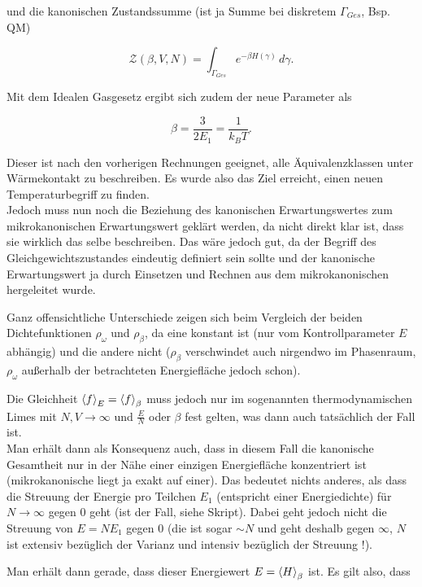 und die kanonischen Zustandssumme (ist ja Summe bei diskretem $\Gamma_{Ges}$, Bsp. QM)

\begin{equation}
\mathcal{Z}(\beta, V, N) = \int_{\Gamma_{Ges}} e^{-\beta H(\gamma)} \, d\gamma .
\end{equation}

Mit dem Idealen Gasgesetz ergibt sich zudem der neue Parameter als

\begin{equation}
\beta = \frac{3}{2 E_1} = \frac{1}{k_B T} .
\end{equation}

Dieser ist nach den vorherigen Rechnungen geeignet, alle Äquivalenzklassen unter Wärmekontakt zu beschreiben. Es wurde also das Ziel erreicht, einen neuen Temperaturbegriff zu finden.\\
Jedoch muss nun noch die Beziehung des kanonischen Erwartungswertes zum mikrokanonischen Erwartungswert geklärt werden, da nicht direkt klar ist, dass sie wirklich das selbe beschreiben. Das wäre jedoch gut, da der Begriff des Gleichgewichtszustandes eindeutig definiert sein sollte und der kanonische Erwartungswert ja durch Einsetzen und Rechnen aus dem mikrokanonischen hergeleitet wurde.

Ganz offensichtliche Unterschiede zeigen sich beim Vergleich der beiden Dichtefunktionen $\rho_\omega$ und $\rho_\beta$, da eine konstant ist (nur vom Kontrollparameter $E$ abhängig) und die andere nicht ($\rho_\beta$ verschwindet auch nirgendwo im Phasenraum, $\rho_\omega$ außerhalb der betrachteten Energiefläche jedoch schon).

Die Gleichheit $\expval{f}_E = \expval{f}_\beta$ muss jedoch nur im sogenannten thermodynamischen Limes mit $N, V \rightarrow \infty$ und $\frac{E}{N}$ oder $\beta$ fest gelten, was dann auch tatsächlich der Fall ist.\\
Man erhält dann als Konsequenz auch, dass in diesem Fall die kanonische Gesamtheit nur in der Nähe einer einzigen Energiefläche konzentriert ist (mikrokanonische liegt ja exakt auf einer). Das bedeutet nichts anderes, als dass die Streuung der Energie pro Teilchen $E_1$ (entspricht einer Energiedichte) für $N \rightarrow \infty$ gegen $0$ geht (ist der Fall, siehe Skript). Dabei geht jedoch nicht die Streuung von $E = N E_1$ gegen $0$ (die ist sogar $\sim N$ und geht deshalb gegen $\infty$, $N$ ist extensiv bezüglich der Varianz und intensiv bezüglich der Streuung !).

Man erhält dann gerade, dass dieser Energiewert $E = \expval{H}_\beta$ ist. Es gilt also, dass

